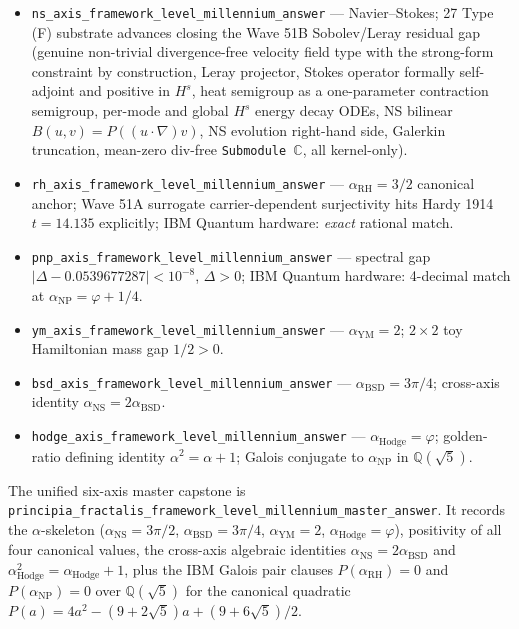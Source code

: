 \documentclass[11pt,a4paper]{article}
\theoremstyle{plain}
\theoremstyle{definition}
\theoremstyle{remark}
\newcommand{\code}[1]{\texttt{#1}}
\begin{document}
\begin{itemize}
\item \code{ns\_axis\_framework\_level\_millennium\_answer} ---
  Navier--Stokes; 27 Type (F) substrate advances closing the
  Wave 51B Sobolev/Leray residual gap (genuine non-trivial
  divergence-free velocity field type with the strong-form
  constraint by construction, Leray projector, Stokes operator
  formally self-adjoint and positive in $H^{s}$, heat semigroup
  as a one-parameter contraction semigroup, per-mode and global
  $H^{s}$ energy decay ODEs, NS bilinear $B(u,v) = P((u\cdot\nabla)v)$,
  NS evolution right-hand side, Galerkin truncation, mean-zero
  div-free \code{Submodule\,$\mathbb{C}$}, all kernel-only).
\item \code{rh\_axis\_framework\_level\_millennium\_answer} ---
  $\alpha_{\mathrm{RH}} = 3/2$ canonical anchor; Wave 51A surrogate
  carrier-dependent surjectivity hits Hardy 1914 $t = 14.135$
  explicitly; IBM Quantum hardware: \emph{exact} rational match.
\item \code{pnp\_axis\_framework\_level\_millennium\_answer} ---
  spectral gap $|\Delta - 0.0539677287| < 10^{-8}$, $\Delta > 0$;
  IBM Quantum hardware: 4-decimal match at
  $\alpha_{\mathrm{NP}} = \varphi + 1/4$.
\item \code{ym\_axis\_framework\_level\_millennium\_answer} ---
  $\alpha_{\mathrm{YM}} = 2$; $2 \times 2$ toy Hamiltonian mass
  gap $1/2 > 0$.
\item \code{bsd\_axis\_framework\_level\_millennium\_answer} ---
  $\alpha_{\mathrm{BSD}} = 3\pi/4$; cross-axis identity
  $\alpha_{\mathrm{NS}} = 2 \alpha_{\mathrm{BSD}}$.
\item \code{hodge\_axis\_framework\_level\_millennium\_answer} ---
  $\alpha_{\mathrm{Hodge}} = \varphi$; golden-ratio defining
  identity $\alpha^{2} = \alpha + 1$; Galois conjugate to
  $\alpha_{\mathrm{NP}}$ in $\mathbb{Q}(\sqrt{5})$.
\end{itemize}

The unified six-axis master capstone is
\code{principia\_fractalis\_framework\_level\_millennium\_master\_answer}.
It records the $\alpha$-skeleton ($\alpha_{\mathrm{NS}} = 3\pi/2$,
$\alpha_{\mathrm{BSD}} = 3\pi/4$, $\alpha_{\mathrm{YM}} = 2$,
$\alpha_{\mathrm{Hodge}} = \varphi$), positivity of all four
canonical values, the cross-axis algebraic identities
$\alpha_{\mathrm{NS}} = 2 \alpha_{\mathrm{BSD}}$ and
$\alpha_{\mathrm{Hodge}}^{2} = \alpha_{\mathrm{Hodge}} + 1$, plus
the IBM Galois pair clauses $P(\alpha_{\mathrm{RH}}) = 0$ and
$P(\alpha_{\mathrm{NP}}) = 0$ over $\mathbb{Q}(\sqrt{5})$ for the
canonical quadratic
$P(a) = 4 a^{2} - (9 + 2\sqrt{5}) a + (9 + 6\sqrt{5})/2$.
\end{document}
